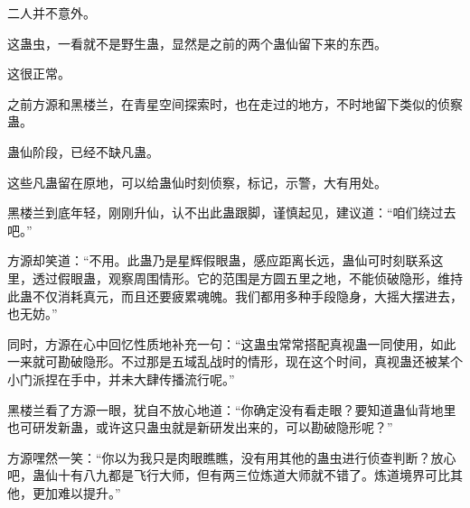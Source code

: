 \begin{this_body}
二人并不意外。

这蛊虫，一看就不是野生蛊，显然是之前的两个蛊仙留下来的东西。

这很正常。

之前方源和黑楼兰，在青星空间探索时，也在走过的地方，不时地留下类似的侦察蛊。

蛊仙阶段，已经不缺凡蛊。

这些凡蛊留在原地，可以给蛊仙时刻侦察，标记，示警，大有用处。

黑楼兰到底年轻，刚刚升仙，认不出此蛊跟脚，谨慎起见，建议道：“咱们绕过去吧。”

方源却笑道：“不用。此蛊乃是星辉假眼蛊，感应距离长远，蛊仙可时刻联系这里，透过假眼蛊，观察周围情形。它的范围是方圆五里之地，不能侦破隐形，维持此蛊不仅消耗真元，而且还要疲累魂魄。我们都用多种手段隐身，大摇大摆进去，也无妨。”

同时，方源在心中回忆性质地补充一句：“这蛊虫常常搭配真视蛊一同使用，如此一来就可勘破隐形。不过那是五域乱战时的情形，现在这个时间，真视蛊还被某个小门派捏在手中，并未大肆传播流行呢。”

黑楼兰看了方源一眼，犹自不放心地道：“你确定没有看走眼？要知道蛊仙背地里也可研发新蛊，或许这只蛊虫就是新研发出来的，可以勘破隐形呢？”

方源嘿然一笑：“你以为我只是肉眼瞧瞧，没有用其他的蛊虫进行侦查判断？放心吧，蛊仙十有八九都是飞行大师，但有两三位炼道大师就不错了。炼道境界可比其他，更加难以提升。”

\end{this_body}

